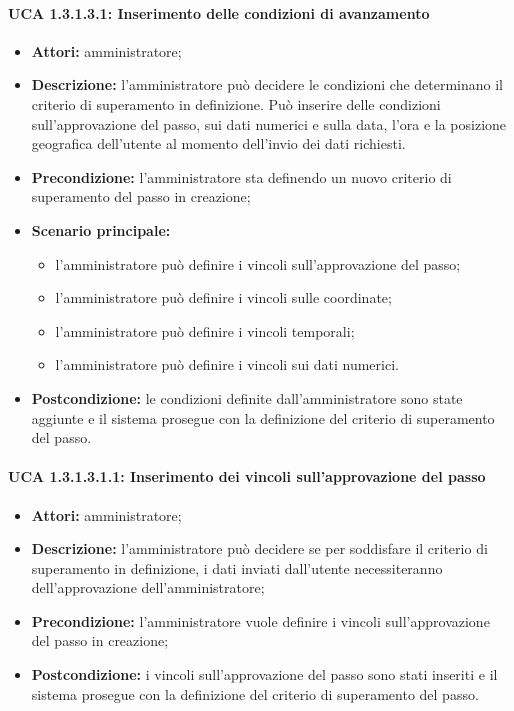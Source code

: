 \paragraph{UCA 1.3.1.3.1: Inserimento delle condizioni di avanzamento}
\begin{itemize}
\item \textbf{Attori:} 
amministratore;
\item \textbf{Descrizione:} 
l'amministratore può decidere le condizioni che determinano il criterio di superamento in definizione.
Può inserire delle condizioni sull'approvazione del passo, sui dati numerici e sulla data, l'ora e la posizione geografica dell'utente al momento dell'invio dei dati richiesti.
\item \textbf{Precondizione:} 
l'amministratore sta definendo un nuovo criterio di superamento del passo in creazione;
\item \textbf{Scenario principale:} 
\begin{itemize}
\item l'amministratore può definire i vincoli sull'approvazione del passo;
\item l'amministratore può definire i vincoli sulle coordinate;
\item l'amministratore può definire i vincoli temporali;
\item l'amministratore può definire i vincoli sui dati numerici.
\end{itemize}
\item \textbf{Postcondizione:}
le condizioni definite dall'amministratore sono state aggiunte e il sistema prosegue con la definizione del criterio di superamento del passo.
\end{itemize}

\paragraph{UCA 1.3.1.3.1.1: Inserimento dei vincoli sull'approvazione del passo}
\begin{itemize}
\item \textbf{Attori:} 
amministratore;
\item \textbf{Descrizione:} 
l'amministratore può decidere se per soddisfare il criterio di superamento in definizione, i dati inviati dall'utente necessiteranno dell'approvazione dell'amministratore;
\item \textbf{Precondizione:} 
l'amministratore vuole definire i vincoli sull'approvazione del passo in creazione;
\item \textbf{Postcondizione:}
i vincoli sull'approvazione del passo sono stati inseriti e il sistema prosegue con la definizione del criterio di superamento del passo.
\end{itemize}

